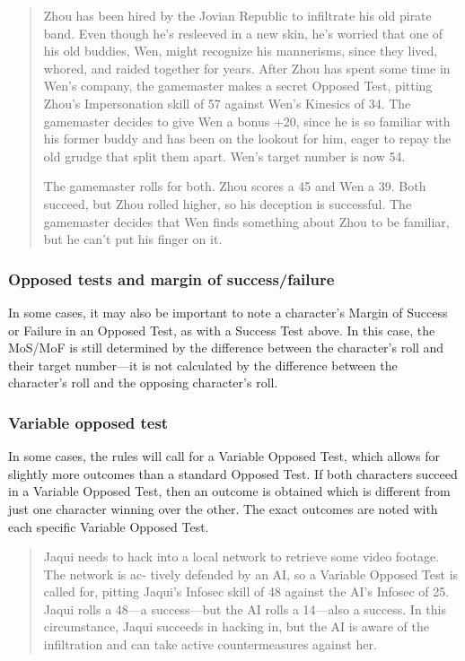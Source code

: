 \begin{quotation}
  Zhou has been hired by the Jovian Republic to infiltrate his old
  pirate band. Even though he's resleeved in a new skin, he's worried
  that one of his old buddies, Wen, might recognize his mannerisms,
  since they lived, whored, and raided together for years. After Zhou
  has spent some time in Wen's company, the gamemaster makes a secret
  Opposed Test, pitting Zhou's Impersonation skill of 57 against Wen's
  Kinesics of 34. The gamemaster decides to give Wen a bonus +20,
  since he is so familiar with his former buddy and has been on the
  lookout for him, eager to repay the old grudge that split them
  apart. Wen's target number is now 54.

  The gamemaster rolls for both. Zhou scores a 45 and Wen a 39. Both
  succeed, but Zhou rolled higher, so his deception is successful. The
  gamemaster decides that Wen finds something about Zhou to be
  familiar, but he can't put his finger on it.
\end{quotation}

\subsubsection{Opposed tests and margin of success/failure}
\label{sec:opposed-tests-margin}

In some cases, it may also be important to note a character's Margin
of Success or Failure in an Opposed Test, as with a Success Test
above. In this case, the MoS/MoF is still determined by the difference
between the character's roll and their target number—it is not
calculated by the difference between the character's roll and the
opposing character's roll.

\subsubsection{Variable opposed test}
\label{sec:vari-oppos-test}

In some cases, the rules will call for a Variable Opposed Test, which
allows for slightly more outcomes than a standard Opposed Test. If
both characters succeed in a Variable Opposed Test, then an outcome is
obtained which is different from just one character winning over the
other. The exact outcomes are noted with each specific Variable
Opposed Test.

\begin{quotation}
  Jaqui needs to hack into a local network to retrieve some video
  footage. The network is ac- tively defended by an AI, so a Variable
  Opposed Test is called for, pitting Jaqui's Infosec skill of 48
  against the AI's Infosec of 25. Jaqui rolls a 48—a success—but the
  AI rolls a 14—also a success. In this circumstance, Jaqui succeeds
  in hacking in, but the AI is aware of the infiltration and can take
  active countermeasures against her.
\end{quotation}

